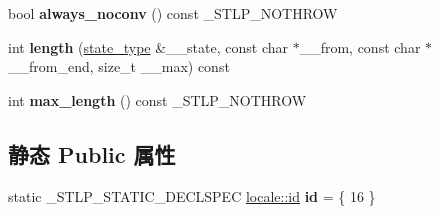 \begin{DoxyCompactItemize}
\mbox{\label{classcodecvt_3_01wchar__t_00_01char_00_01mbstate__t_01_4_aa9aa589ad9a50377a702d896231f5406}} 
bool {\bfseries always\+\_\+noconv} () const \+\_\+\+S\+T\+L\+P\+\_\+\+N\+O\+T\+H\+R\+OW
\item 
\mbox{\label{classcodecvt_3_01wchar__t_00_01char_00_01mbstate__t_01_4_a34b703d44c46f989c227cc728f09519f}} 
int {\bfseries length} (\hyperlink{struct____mbstate__t}{state\+\_\+type} \&\+\_\+\+\_\+state, const char $\ast$\+\_\+\+\_\+from, const char $\ast$\+\_\+\+\_\+from\+\_\+end, size\+\_\+t \+\_\+\+\_\+max) const
\item 
\mbox{\label{classcodecvt_3_01wchar__t_00_01char_00_01mbstate__t_01_4_a23cfa8ecd0ba0ca88c5bab81e3365408}} 
int {\bfseries max\+\_\+length} () const \+\_\+\+S\+T\+L\+P\+\_\+\+N\+O\+T\+H\+R\+OW
\end{DoxyCompactItemize}
\subsection*{静态 Public 属性}
\begin{DoxyCompactItemize}
\item 
\mbox{\label{classcodecvt_3_01wchar__t_00_01char_00_01mbstate__t_01_4_a9d637621a3276abfb037efd1777f37a5}} 
static \+\_\+\+S\+T\+L\+P\+\_\+\+S\+T\+A\+T\+I\+C\+\_\+\+D\+E\+C\+L\+S\+P\+EC \hyperlink{classlocale_1_1id}{locale\+::id} {\bfseries id} = \{ 16 \}
\end{DoxyCompactItemize}
